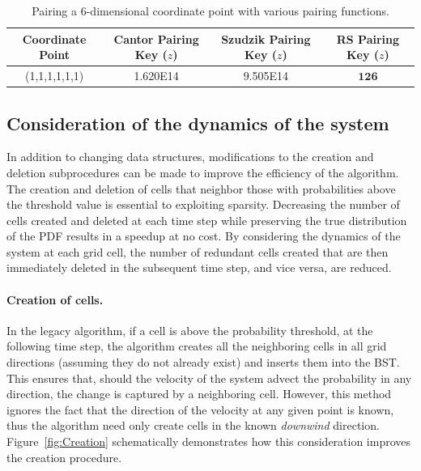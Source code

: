 \documentclass[paper,11pt]{AAS}
\begin{document}
\begin{table}[htbp]
    \caption{Pairing a 6-dimensional coordinate point with various pairing functions.}
   \label{tab:pairing}
    \centering
   \begin{tabular}{| c | c | c | c |} %
      \hline 
     Coordinate Point  & Cantor Pairing Key ($z$) & Szudzik Pairing Key ($z$) & RS Pairing Key ($z$)\\
      \hline 
      (1,1,1,1,1,1)      & \num{1.620E14} & \num{9.505E14} & $\mathbf{126}$ \\
      \hline
   \end{tabular}
\end{table}

\subsection{Consideration of the dynamics of the system}

In addition to changing data structures, modifications to the creation and deletion subprocedures can be made to improve the efficiency of the algorithm. The creation and deletion of cells that neighbor those with probabilities above the threshold value is essential to exploiting sparsity. Decreasing the number of cells created and deleted at each time step while preserving the true distribution of the PDF results in a speedup at no cost. By considering the dynamics of the system at each grid cell, the number of redundant cells created that are then immediately deleted in the subsequent time step, and vice versa, are reduced.
\paragraph{Creation of cells.} In the legacy algorithm, if a cell is above the probability threshold, at the following time step, the algorithm creates all the neighboring cells in all grid directions (assuming they do not already exist) and inserts them into the BST. This ensures that, should the velocity of the system advect the probability in any direction, the change is captured by a neighboring cell. However, this method ignores the fact that the direction of the velocity at any given point is known, thus the algorithm need only create cells in the known \textit{downwind} direction. Figure~\ref{fig:Creation} schematically demonstrates how this consideration improves the creation procedure. 
\end{document}
